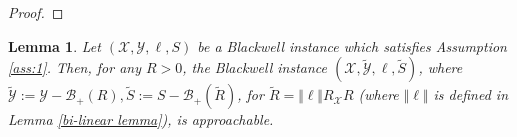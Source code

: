 \documentclass[a4paper,12pt]{article}
\newtheorem{lemma} {Lemma}
\newcommand{\mY}{\mathcal{Y}}
\newcommand{\mX}{\mathcal{X}}
\newcommand{\tY}{\tilde{\mathcal{Y}}}
\newcommand{\tS}{\tilde{S}}
\newcommand{\mB}{\mathcal{B}}
\begin{document}
\begin{proof}
\end{proof}


\begin{lemma}\label{lemma:y_cond}
Let $(\mX ,\mY ,\ell ,S)$ be a Blackwell instance which satisfies Assumption \ref{ass:1}. Then, for any $R>0$, the Blackwell instance  $(\mX ,\tY ,\ell ,\tS)$, where $\tY := \mY- \mathcal{B}_+(R),\tS:= S-\mathcal{B}_+
(\tilde{R})$, for $\tilde{R}=\Vert \ell \Vert R_{\mX} R$ (where $\Vert \ell \Vert $ is defined in Lemma \ref{bi-linear lemma}), is  approachable.
\end{lemma}
\end{document}
